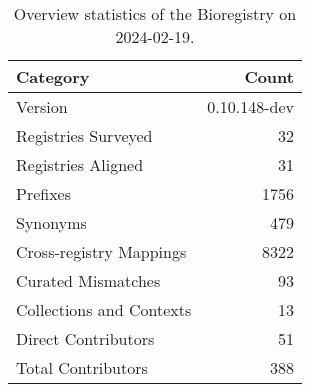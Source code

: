 \begin{table}
\caption{Overview statistics of the Bioregistry on 2024-02-19.}
\label{tab:bioregistry-summary}
\begin{tabular}{lr}
\toprule
Category & Count \\
\midrule
Version & 0.10.148-dev \\
Registries Surveyed & 32 \\
Registries Aligned & 31 \\
Prefixes & 1756 \\
Synonyms & 479 \\
Cross-registry Mappings & 8322 \\
Curated Mismatches & 93 \\
Collections and Contexts & 13 \\
Direct Contributors & 51 \\
Total Contributors & 388 \\
\bottomrule
\end{tabular}
\end{table}
